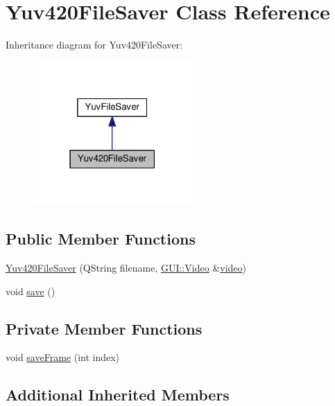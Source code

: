 \hypertarget{classUtility_1_1Yuv420FileSaver}{}\section{Yuv420\+File\+Saver Class Reference}
\label{classUtility_1_1Yuv420FileSaver}


Inheritance diagram for Yuv420\+File\+Saver\+:
\nopagebreak
\begin{figure}[H]
\begin{center}
\leavevmode
\includegraphics[width=171pt]{classUtility_1_1Yuv420FileSaver__inherit__graph}
\end{center}
\end{figure}
\subsection*{Public Member Functions}
\begin{DoxyCompactItemize}
\item 
\hyperlink{classUtility_1_1Yuv420FileSaver_a9fff5cb52eed9373204bae7a75fb6ca3}{Yuv420\+File\+Saver} (Q\+String filename, \hyperlink{classGUI_1_1Video}{G\+U\+I\+::\+Video} \&\hyperlink{classUtility_1_1YuvFileSaver_a1c4d4daa00ecea5e8390244e057da0df}{video})
\item 
void \hyperlink{classUtility_1_1Yuv420FileSaver_aae2c382151ef7c9aa913361172b30db6}{save} ()
\end{DoxyCompactItemize}
\subsection*{Private Member Functions}
\begin{DoxyCompactItemize}
\item 
void \hyperlink{classUtility_1_1Yuv420FileSaver_a8d8bf7ee5feac8d9ae676cda017c5d22}{save\+Frame} (int index)
\end{DoxyCompactItemize}
\subsection*{Additional Inherited Members}


